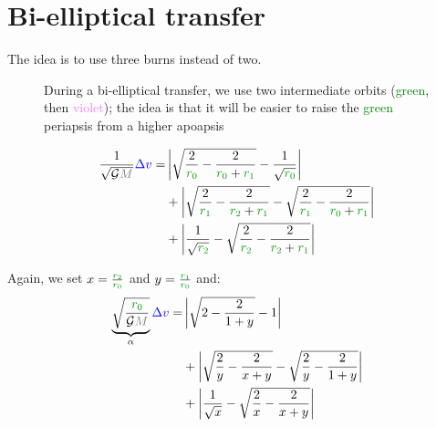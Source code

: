 \section{Bi-elliptical transfer}

The idea is to use three burns instead of two.

\begin{figure}[H]
	\centering
	\caption{
		During a bi-elliptical transfer, we use two
		intermediate orbits (\textcolor{green}{green}, then
		\textcolor{violet}{violet}); the idea is that it will be
		easier to raise the \textcolor{green}{green} periapsis
		from a higher apoapsis
	}
\end{figure}

\begin{align*}
\frac 1 {\sqrt{\mathcal G \mass{M}}} \speed{\Delta v}
=&
\left|
\sqrt{
	\frac 2 {\dist{r_0}}
	-
	\frac 2 {\dist{r_0} + \dist{r_1}}
}
-
\frac 1 {\sqrt{\dist{r_0}}}
\right|
\\
&+
\left|
\sqrt{
	\frac 2 {\dist{r_1}}
	-
	\frac 2 {\dist{r_2} + \dist{r_1}}
}
-
\sqrt{
	\frac 2 {\dist{r_1}}
	-
	\frac 2 {\dist{r_0} + \dist{r_1}}
}
\right|
\\
&+
\left|
\frac 1 {\sqrt{\dist{r_2}}}
-
\sqrt{
	\frac 2 {\dist{r_2}}
	-
	\frac 2 {\dist{r_2} + \dist{r_1}}
}
\right|
\end{align*}

Again, we set $x = \frac {\dist{r_2}} {\dist{r_0}}$ and $y = \frac
{\dist{r_1}} {\dist{r_0}}$ and:
\begin{align*}
\underbrace{
	\sqrt{\frac {\dist{r_0}} {\mathcal G \mass{M}}}
}_{\alpha}
\speed{\Delta v}
=&
\left|
\sqrt{2 - \frac 2 {1 + y}}
-
1
\right|
\\
&+
\left|
\sqrt{\frac 2 y - \frac 2 {x + y}}
-
\sqrt{\frac 2 y - \frac 2 {1 + y}}
\right|
\\
&+
\left|
\frac 1 {\sqrt{x}}
-
\sqrt{\frac 2 x - \frac 2 {x + y}}
\right|
\end{align*}

